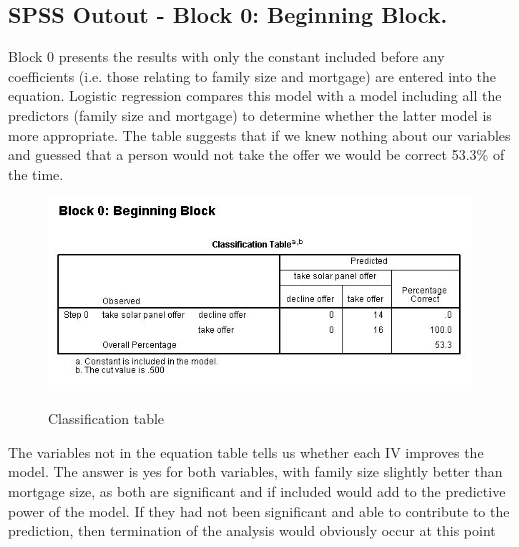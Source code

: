 ﻿\documentclass[a4paper,12pt]{article}
\begin{document}
\subsection{SPSS Outout  - Block 0: Beginning Block.}
Block 0 presents the results with only the constant included
before any coefficients (i.e. those relating to family size and mortgage) are entered into
the equation. Logistic regression compares this model with a model including all the
predictors (family size and mortgage) to determine whether the latter model is more
appropriate. The table suggests that if we knew nothing about our variables and guessed
that a person would not take the offer we would be correct 53.3\% of the time.
\begin{figure}[h!]
\begin{center}
  \includegraphics[scale=0.6]{images/Logistic3}\\
  \caption{Classification table}
\end{center}
\end{figure}
The variables not in the equation table tells us whether each IV improves the model. The answer is yes for both variables, with family size slightly better than mortgage size, as both are significant and if included would add to the predictive power of the model. If they had not been significant and able to contribute to the prediction,
then termination of the analysis would obviously occur at this point
\end{document}
